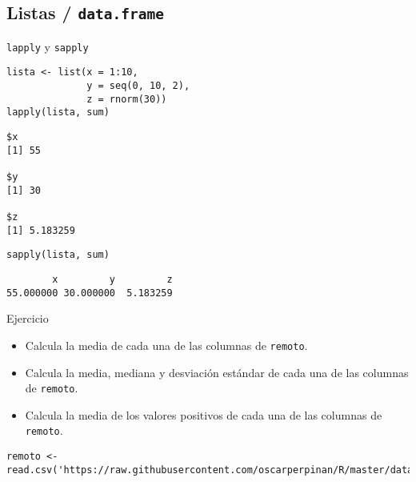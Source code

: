\documentclass[xcolor={usenames,svgnames,dvipsnames}]{beamer}
\begin{document}
\subsection{Listas / \texttt{data.frame}}
\label{sec:org3b135b8}
\begin{frame}[fragile,label={sec:orge7408b3}]{\texttt{lapply} y \texttt{sapply}}
 \lstset{language=r,label= ,caption= ,captionpos=b,numbers=none}
\begin{lstlisting}
lista <- list(x = 1:10,
              y = seq(0, 10, 2),
              z = rnorm(30))
lapply(lista, sum)
\end{lstlisting}

\begin{verbatim}
$x
[1] 55

$y
[1] 30

$z
[1] 5.183259
\end{verbatim}

\lstset{language=r,label= ,caption= ,captionpos=b,numbers=none}
\begin{lstlisting}
sapply(lista, sum)
\end{lstlisting}

\begin{verbatim}
        x         y         z 
55.000000 30.000000  5.183259
\end{verbatim}
\end{frame}

\begin{frame}[fragile,label={sec:org16d2da3}]{Ejercicio}
 \begin{block}{}
\begin{itemize}
\item Calcula la media de cada una de las columnas de \texttt{remoto}.
\item Calcula la media, mediana y desviación estándar de cada una de las columnas de \texttt{remoto}.
\item Calcula la media de los valores positivos de cada una de las columnas de \texttt{remoto}.
\end{itemize}
\end{block}

\begin{block}{}
\lstset{language=r,label= ,caption= ,captionpos=b,numbers=none}
\begin{lstlisting}
remoto <- read.csv('https://raw.githubusercontent.com/oscarperpinan/R/master/data/aranjuez.csv')
\end{lstlisting}
\end{block}
\end{frame}
\end{document}
